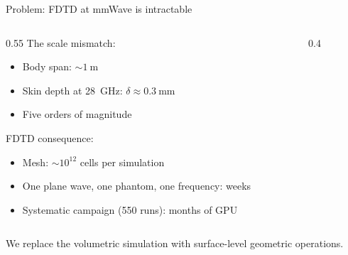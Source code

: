 \begin{frame}{Problem: FDTD at mmWave is intractable}

  \begin{columns}[T]
    \begin{column}{0.55\textwidth}
      The scale mismatch:
      \begin{itemize}
        \item Body span: ${\sim}\SI{1}{\metre}$
        \item Skin depth at \SI{28}{\giga\hertz}: $\delta \approx \SI{0.3}{\milli\metre}$
        \item Five orders of magnitude
      \end{itemize}

      \vspace{8pt}
      FDTD consequence:
      \begin{itemize}
        \item Mesh: ${\sim}10^{12}$ cells per simulation
        \item One plane wave, one phantom, one frequency: weeks
        \item Systematic campaign (550 runs): months of GPU
      \end{itemize}
    \end{column}

    \begin{column}{0.4\textwidth}
      \begin{center}
      \end{center}
    \end{column}
  \end{columns}

  \vspace{4pt}
  \begin{resultbox}
    \centering
    We replace the volumetric simulation with surface-level geometric operations.
  \end{resultbox}
\end{frame}

